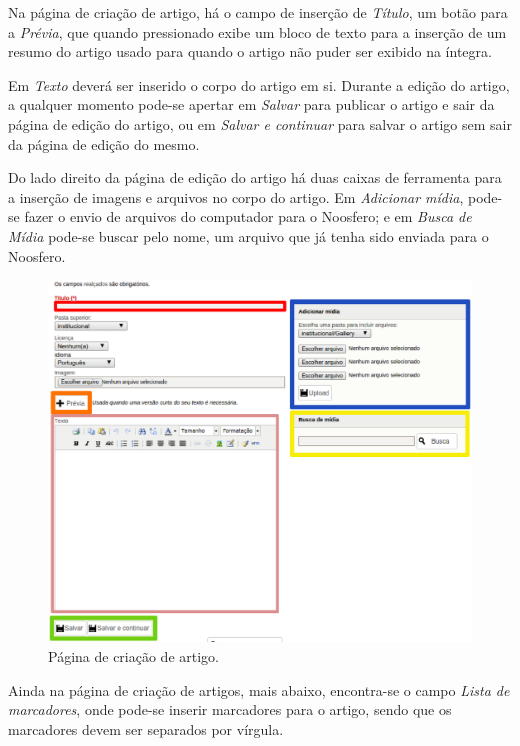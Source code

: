 \newpage
Na página de criação de artigo, há o campo de inserção de \emph{\color{red}Título}, um botão para a \emph{\color{orange}Prévia}, que quando pressionado exibe um bloco de texto para a inserção de um resumo do artigo usado para quando o artigo não puder ser exibido na íntegra.

Em \emph{\color{pink}Texto} deverá ser inserido o corpo do artigo em si. Durante a edição do artigo, a qualquer momento pode-se apertar em \emph{\color{green}Salvar} para publicar o artigo e sair da página de edição do artigo, ou em \emph{\color{green}Salvar e continuar} para salvar o artigo sem sair da página de edição do mesmo.

Do lado direito da página de edição do artigo há duas caixas de ferramenta para a inserção de imagens e arquivos no corpo do artigo. Em \emph{\color{blue}Adicionar mídia}, pode-se fazer o envio de arquivos do computador para o Noosfero; e em \emph{\color{yellow}Busca de Mídia} pode-se buscar pelo nome, um arquivo que já tenha sido enviada para o Noosfero.

\begin{figure}[H]
  \centering
    \includegraphics[keepaspectratio=true,scale=0.49]{figuras/criandoArtigo2.eps}
  \caption{Página de criação de artigo.}
  \label{fig:CriacaoArtigo}
\end{figure}

\newpage
Ainda na página de criação de artigos, mais abaixo, encontra-se o campo \emph{\color{yellow}Lista de marcadores}, onde pode-se inserir marcadores para o artigo, sendo que os marcadores devem ser separados por vírgula.


